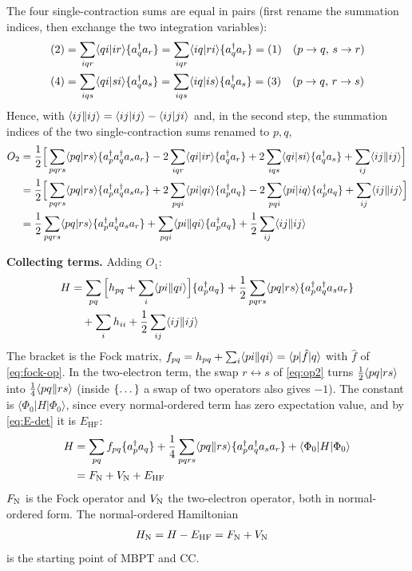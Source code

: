 The four single-contraction sums are equal in pairs (first rename the summation indices, then exchange the two integration variables):
\begin{align*}
(2) &= \sum_{iqr} \langle qi\vert ir\rangle \{a^{\dagger}_{q} a_{r}\} = \sum_{iqr} \langle iq\vert ri\rangle \{a^{\dagger}_{q} a_{r}\} = (1) \quad\text{($p \to q$, $s \to r$)} \\
(4) &= \sum_{iqs} \langle qi\vert si\rangle \{a^{\dagger}_{q} a_{s}\} = \sum_{iqs} \langle iq\vert is\rangle \{a^{\dagger}_{q} a_{s}\} = (3) \quad\text{($p \to q$, $r \to s$)}
\end{align*}
Hence, with $\langle ij\Vert ij\rangle = \langle ij\vert ij\rangle - \langle ij\vert ji\rangle$ and, in the second step, the summation indices of the two single-contraction sums renamed to $p, q$,
\begin{align*}
O_2 &= \frac{1}{2} \Big[ \sum_{pqrs} \langle pq\vert rs\rangle \{a^{\dagger}_{p} a^{\dagger}_{q} a_{s} a_{r}\} - 2 \sum_{iqr} \langle qi\vert ir\rangle \{a^{\dagger}_{q} a_{r}\} + 2 \sum_{iqs} \langle qi\vert si\rangle \{a^{\dagger}_{q} a_{s}\} + \sum_{ij} \langle ij\Vert ij\rangle \Big] \\
&= \frac{1}{2} \Big[ \sum_{pqrs} \langle pq\vert rs\rangle \{a^{\dagger}_{p} a^{\dagger}_{q} a_{s} a_{r}\} + 2 \sum_{pqi} \langle pi\vert qi\rangle \{a^{\dagger}_{p} a_{q}\} - 2 \sum_{pqi} \langle pi\vert iq\rangle \{a^{\dagger}_{p} a_{q}\} + \sum_{ij} \langle ij\Vert ij\rangle \Big] \\
&= \frac{1}{2} \sum_{pqrs} \langle pq\vert rs\rangle \{a^{\dagger}_{p} a^{\dagger}_{q} a_{s} a_{r}\} + \sum_{pqi} \langle pi\Vert qi\rangle \{a^{\dagger}_{p} a_{q}\} + \frac{1}{2} \sum_{ij} \langle ij\Vert ij\rangle
\end{align*}

\textbf{Collecting terms.} Adding $O_1$:
\begin{align*}
H &= \sum_{pq} \Big[ h_{pq} + \sum_i \langle pi\Vert qi\rangle \Big] \{a^{\dagger}_{p} a_{q}\} + \frac{1}{2} \sum_{pqrs} \langle pq\vert rs\rangle \{a^{\dagger}_{p} a^{\dagger}_{q} a_{s} a_{r}\} \\
&\quad + \sum_i h_{ii} + \frac{1}{2} \sum_{ij} \langle ij\Vert ij\rangle
\end{align*}
The bracket is the Fock matrix, $f_{pq} = h_{pq} + \sum_i \langle pi\Vert qi\rangle = \langle p|\hat{f}|q\rangle$ with $\hat{f}$ of \eqref{eq:fock-op}. In the two-electron term, the swap $r \leftrightarrow s$ of \eqref{eq:op2} turns $\frac{1}{2} \langle pq\vert rs\rangle$ into $\frac{1}{4} \langle pq\Vert rs\rangle$ (inside $\{\dots\}$ a swap of two operators also gives $-1$). The constant is $\langle \Phi_0|H|\Phi_0\rangle$, since every normal-ordered term has zero expectation value, and by \eqref{eq:E-det} it is $E_{\text{HF}}$:
\begin{align}
H &= \sum_{pq} f_{pq} \{a^{\dagger}_{p} a_{q}\} + \frac{1}{4} \sum_{pqrs} \langle pq\Vert rs\rangle \{a^{\dagger}_{p} a^{\dagger}_{q} a_{s} a_{r}\} + \langle \Phi_0|H|\Phi_0\rangle \notag \\
&= F_{\mathrm{N}} + V_{\mathrm{N}} + E_{\text{HF}} \label{eq:HN}
\end{align}
$F_{\mathrm{N}}$ is the Fock operator and $V_{\mathrm{N}}$ the two-electron operator, both in normal-ordered form. The normal-ordered Hamiltonian
\begin{align*}
H_{\mathrm{N}} &= H - E_{\text{HF}} = F_{\mathrm{N}} + V_{\mathrm{N}}
\end{align*}
is the starting point of MBPT and CC.

